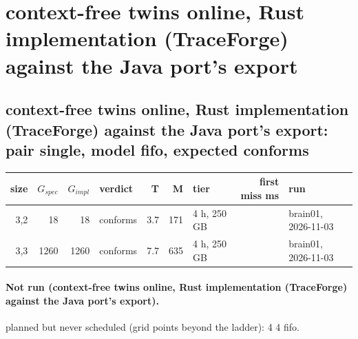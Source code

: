 \documentclass[10pt]{article}
\begin{document}
\section*{context-free twins online, Rust implementation (TraceForge) against the Java port's export}
\subsection*{context-free twins online, Rust implementation (TraceForge) against the Java port's export: pair \textsf{single}, model fifo, expected conforms}
\begin{longtable}{@{}rrrlrrlrl@{}}
\toprule
size & $G_{\mathit{spec}}$ & $G_{\mathit{impl}}$ & verdict & T & M & tier & first miss ms & run \\
\midrule
\endhead
\color{red} 3,2 & 18 & 18 & conforms & 3.7 & 171 & 4 h, 250 GB &  & brain01, 2026-11-03 \\
\color{red} 3,3 & 1260 & 1260 & conforms & 7.7 & 635 & 4 h, 250 GB &  & brain01, 2026-11-03 \\
\bottomrule
\end{longtable}
\paragraph{Not run (context-free twins online, Rust implementation (TraceForge) against the Java port's export).}
planned but never scheduled (grid points beyond the ladder): 4 4 fifo.\par
\end{document}

